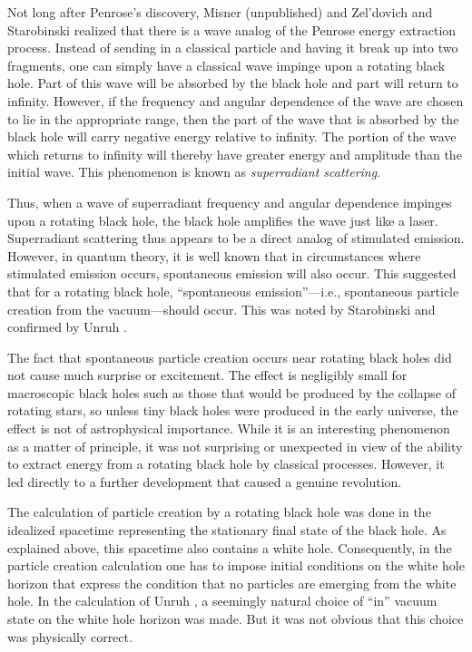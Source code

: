 \documentclass[12pt,epsf,amsfonts,amssymb]{article}
\begin{document}
Not long after Penrose's discovery, Misner (unpublished) and
Zel'dovich and Starobinski \cite{z,s} realized that there is a wave
analog of the Penrose energy extraction process. Instead of sending in
a classical particle and having it break up into two fragments, one
can simply have a classical wave impinge upon a rotating black
hole. Part of this wave will be absorbed by the black hole and part
will return to infinity. However, if the frequency and angular
dependence of the wave are chosen to lie in the appropriate range,
then the part of the wave that is absorbed by the black hole will
carry negative energy relative to infinity. The portion of the wave
which returns to infinity will thereby have greater energy and
amplitude than the initial wave. This phenomenon is known as {\it
superradiant scattering}.

Thus, when a wave of superradiant frequency and angular dependence
impinges upon a rotating black hole, the black hole amplifies the wave
just like a laser. Superradiant scattering thus appears to be a direct
analog of stimulated emission. However, in quantum theory, it is well
known that in circumstances where stimulated emission occurs,
spontaneous emission will also occur. This suggested that for a
rotating black hole, ``spontaneous emission''---i.e., spontaneous
particle creation from the vacuum---should occur. This was noted by
Starobinski \cite{s} and confirmed by Unruh \cite{u1}.

The fact that spontaneous particle creation occurs near rotating black
holes did not cause much surprise or excitement. The effect is
negligibly small for macroscopic black holes such as those that would
be produced by the collapse of rotating stars, so unless tiny black
holes were produced in the early universe, the effect is not of
astrophysical importance. While it is an interesting phenomenon as a
matter of principle, it was not surprising or unexpected in view of
the ability to extract energy from a rotating black hole by classical
processes. However, it led directly to a further development that
caused a genuine revolution.

The calculation of particle creation by a rotating black hole was done
in the idealized spacetime representing the stationary final state of
the black hole. As explained above, this spacetime also contains a white
hole. Consequently, in the particle
creation calculation one has to impose initial conditions on the white
hole horizon that express the condition that no particles are emerging
from the white hole. In the calculation of Unruh \cite{u1}, a seemingly natural
choice of ``in'' vacuum state on the white hole horizon was made. But
it was not obvious that this choice was physically correct.
\end{document}
